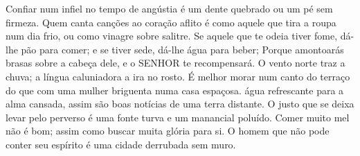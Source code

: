 {  Confiar num infiel no tempo de angústia é
{} um dente quebrado ou um pé sem firmeza.
  Quem canta canções ao coração aflito é como aquele que tira a roupa num dia frio, ou como vinagre sobre salitre.
  Se aquele que te odeia tiver fome, dá-lhe pão para comer; e se tiver sede, dá-lhe água para beber;
  Porque
{} amontoarás brasas sobre a cabeça dele, e o SENHOR te recompensará.
  O vento norte traz a chuva;
{} a língua caluniadora
{} a ira no rosto.
  É melhor morar num canto do terraço do que com uma mulher briguenta numa casa espaçosa.
   água refrescante para a alma cansada, assim são boas notícias de uma terra distante.
  O justo que se deixa levar pelo perverso é
{} uma fonte turva e um manancial poluído.
  Comer muito mel não é bom; assim como buscar muita glória para si.
  O homem que não pode conter seu espírito é
{} uma cidade derrubada sem muro.
\par }

